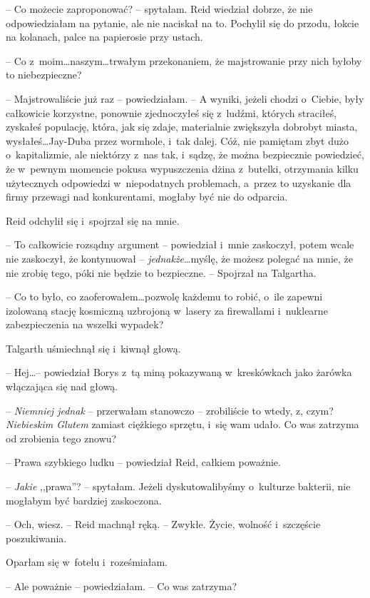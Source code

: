 \documentclass[oneside,polish,11pt,sfheadings]{mwbk}
\begin{document}
-- Co możecie zaproponować? -- spytałam. Reid wiedział dobrze, że nie odpowiedziałam na pytanie, ale
nie naciskał na to. Pochylił się do przodu, łokcie na kolanach, palce na
papierosie przy ustach. 

-- Co z~moim\ldots  naszym\ldots  trwałym przekonaniem,
że majstrowanie przy nich byłoby to niebezpieczne?

-- Majstrowaliście już raz -- powiedziałam. -- A wyniki, jeżeli chodzi o~Ciebie, były całkowicie korzystne, ponownie zjednoczyłeś się z~ludźmi,
których straciłeś, zyskałeś populację, która, jak się zdaje, materialnie
zwiększyła dobrobyt miasta, wysłałeś\ldots  Jay-Duba przez wormhole, i~tak
dalej. Cóż, nie pamiętam zbyt dużo o~kapitalizmie, ale niektórzy z~nas
tak, i~sądzę, że można bezpiecznie powiedzieć, że w~pewnym momencie
pokusa wypuszczenia dżina z~butelki, otrzymania kilku użytecznych
odpowiedzi w~niepodatnych problemach, a~przez to uzyskanie dla firmy
przewagi nad konkurentami, mogłaby być nie do odparcia.

Reid odchylił się i~spojrzał się na mnie. 

-- To całkowicie rozsądny
argument -- powiedział i~mnie zaskoczył, potem wcale nie zaskoczył, że
kontynuował -- \textit{jednakże}\ldots  myślę, że możesz polegać na mnie, że
nie zrobię tego, póki nie będzie to bezpieczne. -- Spojrzał na Talgartha.

-- Co to było, co zaoferowałem\ldots  pozwolę każdemu to robić, o~ile zapewni
izolowaną stację kosmiczną uzbrojoną w~lasery za firewallami i~nuklearne
zabezpieczenia na wszelki wypadek?

Talgarth uśmiechnął się i~kiwnął głową.

-- Hej\ldots  -- powiedział Borys z~tą miną pokazywaną w~kreskówkach jako
żarówka włączająca się nad głową.

-- \textit{Niemniej jednak} -- przerwałam stanowczo -- zrobiliście to wtedy,
z, czym? \textit{Niebieskim Glutem} zamiast ciężkiego sprzętu, i~się wam
udało. Co was zatrzyma od zrobienia tego znowu?

-- Prawa szybkiego ludku -- powiedział Reid, całkiem poważnie.

-- \textit{Jakie} ,,prawa''? -- spytałam. Jeżeli dyskutowalibyśmy o~kulturze
bakterii, nie mogłabym być bardziej zaskoczona.

-- Och, wiesz. -- Reid machnął ręką. -- Zwykłe. Życie, wolność i~szczęście
poszukiwania.

Oparłam się w~fotelu i~roześmiałam. 

-- Ale poważnie -- powiedziałam. -- Co was zatrzyma?
\end{document}
